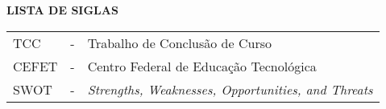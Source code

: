 \begin{center}
\textbf{\large LISTA DE SIGLAS}
\end{center}
      \vspace{0.5cm}

\singlespacing

\noindent
\begin{tabular}{l c p{.85\linewidth}}

TCC & - & Trabalho de Conclusão de Curso \\
CEFET & - & Centro Federal de Educação Tecnológica \\
SWOT  & - &  {\it Strengths, Weaknesses, Opportunities, and Threats}\\


\end{tabular}

\onehalfspacing